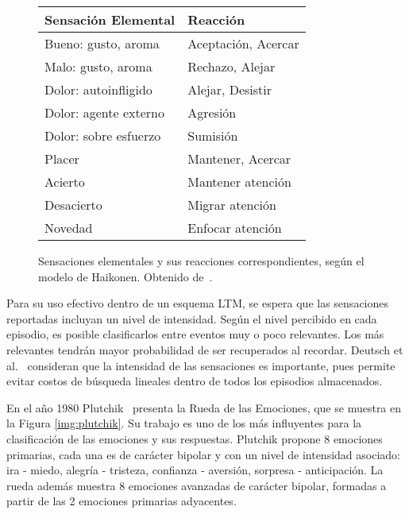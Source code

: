 \begin{figure}[!ht]
	\centering
	\begin{tabular}{| l | l |}
		\hline
		\rowcolor{gray!50}
		Sensación Elemental & Reacción  \\ 
		\hline Bueno: gusto, aroma & Aceptación, Acercar \\ 
		\hline Malo: gusto, aroma & Rechazo, Alejar \\ 
		\hline Dolor: autoinfligido  & Alejar, Desistir \\ 
		\hline Dolor: agente externo & Agresión \\ 
		\hline Dolor: sobre esfuerzo & Sumisión \\ 
		\hline Placer & Mantener, Acercar \\ 
		\hline Acierto & Mantener atención \\ 
		\hline Desacierto & Migrar atención \\ 
		\hline Novedad & Enfocar atención \\ 
		\hline 
	\end{tabular} 
	\caption{\small Sensaciones elementales y sus reacciones correspondientes, según el modelo de Haikonen. Obtenido de~\cite{Dodd2005}.}
	\label{img:emotional_haikonen}
\end{figure}

Para su uso efectivo dentro de un esquema LTM, se espera que las sensaciones reportadas incluyan un nivel de intensidad. Según el nivel percibido en cada episodio, es posible clasificarlos entre eventos muy o poco relevantes. Los más relevantes tendrán mayor probabilidad de ser recuperados al recordar. Deutsch et al.~\cite{Deutsch2008} consideran que la intensidad de las sensaciones es importante, pues permite evitar costos de búsqueda lineales dentro de todos los episodios almacenados.

En el año 1980 Plutchik~\cite{plutchik1980} presenta la Rueda de las Emociones, que se muestra en la Figura \ref{img:plutchik}. Su trabajo es uno de los más influyentes para la clasificación de las emociones y sus respuestas. Plutchik propone 8 emociones primarias, cada una es de carácter bipolar y con un nivel de intensidad asociado: ira - miedo, alegría - tristeza, confianza - aversión, sorpresa - anticipación. La rueda además muestra 8 emociones avanzadas de carácter bipolar, formadas a partir de las 2 emociones primarias adyacentes.


